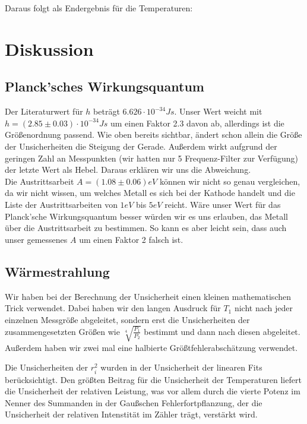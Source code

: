 \documentclass[12pt,a4paper,twopage]{article}
\begin{document}
Daraus folgt als Endergebnis für die Temperaturen:
\begin{center}

\end{center}
\newpage
\section{Diskussion}
\subsection{Planck'sches Wirkungsquantum}
Der Literaturwert für $h$ beträgt $6.626 \cdot 10^{-34}Js$. Unser Wert weicht mit $h=(2.85 \pm 0.03)\cdot 10^{-34}Js$ um einen Faktor 2.3 davon ab, allerdings ist die Größenordnung passend. Wie oben bereits sichtbar, ändert schon allein die Größe der Unsicherheiten die Steigung der Gerade. Außerdem wirkt aufgrund der geringen Zahl an Messpunkten (wir hatten nur 5 Frequenz-Filter zur Verfügung) der letzte Wert als Hebel. Daraus erklären wir uns die Abweichung.\\
Die Austrittsarbeit $A=(1.08 \pm 0.06)eV$ können wir nicht so genau vergleichen, da wir nicht wissen, um welches Metall es sich bei der Kathode handelt und die Liste der Austrittsarbeiten von $1eV$ bis $5eV$ reicht. Wäre unser Wert für das Planck'sche Wirkungsquantum besser würden wir es uns erlauben, das Metall über die Austrittsarbeit zu bestimmen. So kann es aber leicht sein, dass auch unser gemessenes $A$ um einen Faktor 2 falsch ist.

\subsection{Wärmestrahlung}
Wir haben bei der Berechnung der Unsicherheit einen kleinen mathematischen Trick verwendet. Dabei haben wir den langen Ausdruck für $T_1$ nicht nach jeder einzelnen Messgröße abgeleitet, sondern erst die Unsicherheiten der zusammengesetzten Größen wie $\sqrt[4]{\frac{P_1}{P_2}}$ bestimmt und dann nach diesen abgeleitet. Außerdem haben wir zwei mal eine halbierte Größtfehlerabschätzung verwendet.   

Die Unsicherheiten der $r_i^2$ wurden in der Unsicherheit der linearen Fits berücksichtigt. Den größten Beitrag für die Unsicherheit der Temperaturen liefert die Unsicherheit der relativen Leistung, was vor allem durch die vierte Potenz im Nenner des Summanden in der Gaußschen Fehlerfortpflanzung, der die Unsicherheit der relativen Intenstität im Zähler trägt, verstärkt wird. \\
																							
\end{document}
